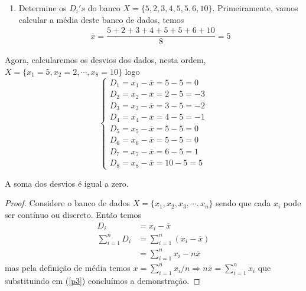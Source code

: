 \begin{enumerate}
    \item [(i)] Determine os $D_i's$ do banco $X = \{5,2,3,4,5,5,6,10\}$.
    Primeiramente, vamos calcular a média deste banco de dados, temos 
    \begin{align*}
        \overline{x} = \dfrac{5 + 2 + 3 + 4 + 5 + 5 + 6 + 10}{8} = 5
    \end{align*}
\end{enumerate}
Agora, calcularemos os desvios dos dados, nesta ordem, $X = \{x_1 = 5,x_2 = 2,\cdots, x_8 = 10\}$ logo
\begin{equation*}
    \begin{cases}
    D_1 = x_1 - \overline{x} = 5 - 5 =0\\
    D_2 = x_2 - \overline{x} = 2 - 5 =-3\\
    D_3 = x_3 - \overline{x} = 3 - 5 =-2\\
    D_4 = x_4 - \overline{x} = 4 - 5 =-1\\
    D_5 = x_5 - \overline{x} = 5 - 5 =0\\
    D_6 = x_6 - \overline{x} = 5 - 5 =0\\
    D_7 = x_7 - \overline{x} = 6 - 5 =1\\
    D_8 = x_8 - \overline{x} = 10 - 5 =5
    \end{cases}
\end{equation*}
\begin{prop}
\label{desvios0}
A soma dos desvios é igual a zero.
\end{prop}

\begin{proof}
Considere o banco de dados $X = \{x_1,x_2,x_3,\cdots,x_n\}$ sendo que cada $x_i$ pode ser contínuo ou discreto. Então temos
\begin{align}
    \label{p1}
    D_i &= x_i - \overline{x}\\ 
    \label{p2}
    \sum_{i=1}^{n} D_i &= \sum_{i=1}^{n} (x_i - \overline{x})\\
    \label{p3}
      &= \sum_{i=1}^{n} x_i - n\overline{x}
\end{align}
mas pela definição de média temos $\overline{x} = \sum_{i=1}^{n} x_i/n \Rightarrow n\overline{x} = \sum_{i=1}^{n} x_i$ que substituindo em (\ref{p3}) concluímos a demonstração.
\end{proof}

